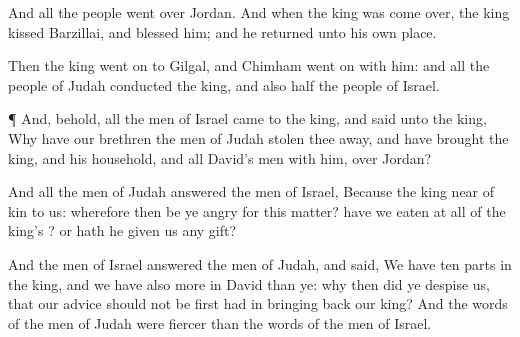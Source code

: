 {And all the
people went
over
Jordan. And when the
king was come
over, the
king
kissed
Barzillai, and
blessed him; and he
returned unto his own
place.


\par }{\PP {}Then the
king went
on to
Gilgal, and
Chimham went
on with him: and all the
people of
Judah
conducted the
king, and also
half the
people of
Israel.


\par }{\PP {}¶ And, behold, all the
men of
Israel
came to the
king, and
said unto the
king, Why have our
brethren the
men of
Judah stolen thee
away, and have
brought the
king, and his
household, and all
David’s
men with him, over
Jordan?

And all the
men of
Judah
answered the
men of
Israel, Because the
king
{} near of
kin to us: wherefore then be ye
angry for this
matter? have we
eaten at
all of the
king’s
{}? or hath he
given us any
gift?

And the
men of
Israel
answered the
men of
Judah, and
said, We have
ten
parts in the
king, and
we have also more
{} in
David than ye: why then did ye
despise us, that our
advice should not be
first had in bringing
back our
king? And the
words of the
men of
Judah were
fiercer than the
words of the
men of
Israel.




\par }
